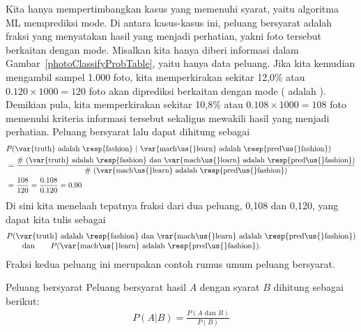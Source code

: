 Kita hanya mempertimbangkan kasus yang memenuhi syarat,
yaitu algoritma ML memprediksi mode.
Di antara kasus-kasus ini, peluang bersyarat adalah
fraksi yang menyatakan hasil yang menjadi perhatian, yakni
foto tersebut berkaitan dengan mode.
Misalkan kita hanya diberi informasi dalam
Gambar~\ref{photoClassifyProbTable}, yaitu hanya data peluang.
Jika kita kemudian mengambil sampel 1.000 foto, kita memperkirakan
sekitar 12,0\% atau $0.120\times 1000 = 120$ foto akan diprediksi
berkaitan dengan mode ( adalah ).
Demikian pula, kita memperkirakan sekitar 10,8\% atau
$0.108\times 1000 = 108$ foto memenuhi kriteria informasi tersebut
sekaligus mewakili hasil yang menjadi perhatian.
Peluang bersyarat lalu dapat dihitung sebagai
\begin{align*}
&P(\text{\var{truth} adalah \resp{fashion}}\ |\ 
    \text{\var{mach\us{}learn} adalah \resp{pred\us{}fashion}}) \\
  &= \frac{\text{\# (\var{truth} adalah \resp{fashion}
      dan \var{mach\us{}learn} adalah \resp{pred\us{}fashion})}}
    {\text{\# (\var{mach\us{}learn} adalah \resp{pred\us{}fashion})}} \\
  &= \frac{108}{120}
		= \frac{0.108}{0.120}
		= 0.90
\end{align*}
Di sini kita menelaah tepatnya fraksi dari dua peluang,
0,108 dan 0,120, yang dapat kita tulis sebagai
\begin{align*}
&P(\text{\var{truth} adalah \resp{fashion} dan
    \var{mach\us{}learn} adalah \resp{pred\us{}fashion}})
\\[-1mm]
&\qquad\text{dan}\qquad
P(\text{\var{mach\us{}learn} adalah \resp{pred\us{}fashion}}).
\end{align*}
Fraksi kedua peluang ini merupakan contoh
rumus umum peluang bersyarat.

\begin{onebox}{Peluang bersyarat}
  Peluang bersyarat hasil $A$
  dengan syarat $B$ dihitung sebagai berikut:
  \begin{align*}
  P(A | B) = \frac{P(A\text{ dan }B)}{P(B)}
  \end{align*}
\end{onebox}


